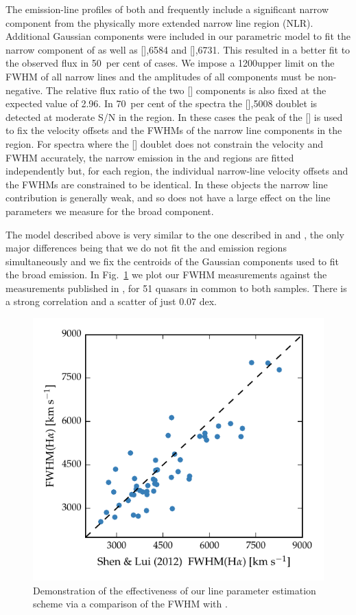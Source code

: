 The emission-line profiles of both \hb and \ha frequently include a significant narrow component from the physically more extended narrow line region (NLR). 
Additional Gaussian components were included in our parametric model to fit the narrow component of \ha as well as [],6584 and [],6731.
This resulted in a better fit to the observed flux in 50\, per cent of cases. 
We impose a 1200\kms upper limit on the FWHM of all narrow lines and the amplitudes of all components must be non-negative.
The relative flux ratio of the two [] components is also fixed at the expected value of 2.96.
In 70\, per cent of the spectra the [],5008 doublet is detected at moderate S/N in the \hb region. 
In these cases the peak of the [] is used to fix the velocity offsets and the FWHMs of the narrow line components in the \ha region.  
For spectra where the [] doublet does not constrain the velocity and FWHM accurately, the narrow emission in the \ha and \hb regions are fitted independently but, for each region, the individual narrow-line velocity offsets and the FWHMs are constrained to be identical. 
In these objects the narrow line contribution is generally weak, and so does not have a large effect on the line parameters we measure for the broad component.   

The model described above is very similar to the one described in \citet{shen12} and \citet{shen11}, the only major differences being that we do not fit the \ha and \hb emission regions simultaneously and we fix the centroids of the Gaussian components used to fit the broad emission.
In Fig.~\ref{fig:shen_comparison_ha} we plot our \ha FWHM measurements against the measurements published in \citet{shen12}, for 51 quasars in common to both samples.
There is a strong correlation and a scatter of just 0.07 dex. 

\begin{figure}
    \centering 
    \includegraphics[width=0.8\linewidth]{figures/chapter03/shen_comparison_ha.pdf} 
    \caption{Demonstration of the effectiveness of our line parameter estimation scheme via a comparison of the \ha FWHM with \citet{shen12}.} 
    \label{fig:shen_comparison_ha}
\end{figure}

